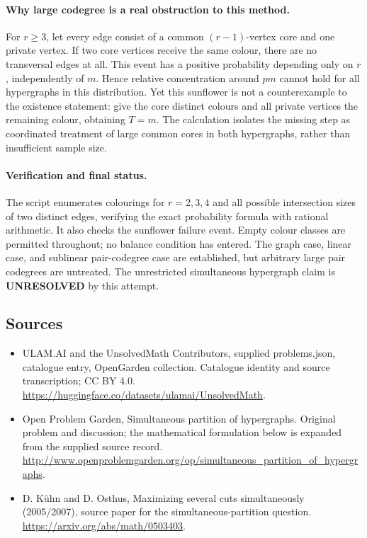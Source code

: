\documentclass[11pt,a4paper]{article}
\begin{document}
\paragraph{Why large codegree is a real obstruction to this method.}
For $r\ge3$, let every edge consist of a common $(r-1)$-vertex core and one private vertex. If two core vertices receive the same colour, there are no transversal edges at all. This event has a positive probability depending only on $r$, independently of $m$. Hence relative concentration around $pm$ cannot hold for all hypergraphs in this distribution. Yet this sunflower is not a counterexample to the existence statement: give the core distinct colours and all private vertices the remaining colour, obtaining $T=m$. The calculation isolates the missing step as coordinated treatment of large common cores in both hypergraphs, rather than insufficient sample size.

\paragraph{Verification and final status.}
The script enumerates colourings for $r=2,3,4$ and all possible intersection sizes of two distinct edges, verifying the exact probability formula with rational arithmetic. It also checks the sunflower failure event. Empty colour classes are permitted throughout; no balance condition has entered. The graph case, linear case, and sublinear pair-codegree case are established, but arbitrary large pair codegrees are untreated. The unrestricted simultaneous hypergraph claim is \textbf{UNRESOLVED} by this attempt.

\subsection{Sources}
\begin{itemize}
\item[S1] ULAM.AI and the UnsolvedMath Contributors, supplied problems.json, catalogue entry, OpenGarden collection. Catalogue identity and source transcription; CC BY 4.0.
\url{https://huggingface.co/datasets/ulamai/UnsolvedMath}.
\item[S2] Open Problem Garden, Simultaneous partition of hypergraphs. Original problem and discussion; the mathematical formulation below is expanded from the supplied source record.
\url{http://www.openproblemgarden.org/op/simultaneous_partition_of_hypergraphs}.
\item[S3] D. Kühn and D. Osthus, Maximizing several cuts simultaneously (2005/2007), source paper for the simultaneous-partition question.
\url{https://arxiv.org/abs/math/0503403}.

\end{itemize}
\end{document}
